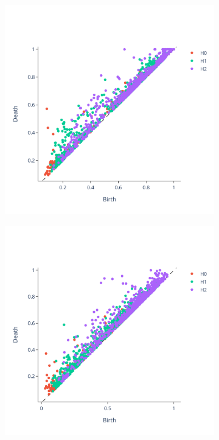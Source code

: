 \documentclass{article}
\begin{document}
\begin{figure}
  \centering
  \begin{subfigure}{0.3\textwidth}
    \includegraphics[width=\textwidth]{figures/PDs/persistence_diagram_CN.png}
  \end{subfigure}
  \begin{subfigure}{0.3\textwidth}
    \includegraphics[width=\textwidth]{figures/PDs/persistence_diagram_MCI.png}

\end{subfigure}
\end{figure}
\end{document}

